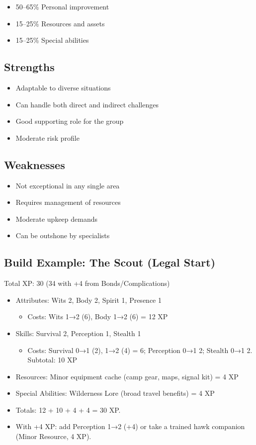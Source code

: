 \documentclass[11pt,twoside,openany]{book}
\begin{document}
\begin{itemize}
\item 50–65\% Personal improvement
\item 15–25\% Resources and assets
\item 15–25\% Special abilities
\end{itemize}

\subsection*{Strengths}

\begin{itemize}
\item Adaptable to diverse situations
\item Can handle both direct and indirect challenges
\item Good supporting role for the group
\item Moderate risk profile
\end{itemize}

\subsection*{Weaknesses}

\begin{itemize}
\item Not exceptional in any single area
\item Requires management of resources
\item Moderate upkeep demands
\item Can be outshone by specialists
\end{itemize}

\subsection*{Build Example: The Scout (Legal Start)}

Total XP: 30 (34 with +4 from Bonds/Complications)

\begin{itemize}
\item Attributes: Wits 2, Body 2, Spirit 1, Presence 1
\begin{itemize}
\item Costs: Wits 1→2 (6), Body 1→2 (6) = 12 XP
\end{itemize}
\item Skills: Survival 2, Perception 1, Stealth 1
\begin{itemize}
\item Costs: Survival 0→1 (2), 1→2 (4) = 6; Perception 0→1 2; Stealth 0→1 2. Subtotal: 10 XP
\end{itemize}
\item Resources: Minor equipment cache (camp gear, maps, signal kit) = 4 XP
\item Special Abilities: Wilderness Lore (broad travel benefits) = 4 XP
\item Totals: 12 + 10 + 4 + 4 = 30 XP.
\item With +4 XP: add Perception 1→2 (+4) or take a trained hawk companion (Minor Resource, 4 XP).
\end{itemize}
\end{document}
